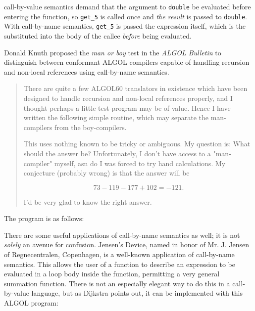 

\Gls{call-by-value} semantics demand that the argument to \texttt{double} be evaluated
before entering the function, so \texttt{get\_5} is called once and
\textit{the result} is passed to \texttt{double}.
With call-by-name semantics, \texttt{get\_5} is passed the expression itself,
which is the substituted into the body of the callee \textit{before}
being evaluated.

Donald Knuth proposed the \textit{man or boy} test in the \textit{ALGOL Bulletin}
to distinguish between
conformant ALGOL compilers capable of handling recursion and non-local references
using call-by-name semantics\cite{Knuth1964ManOrBoy}.

\begin{quotation}
	There are quite a few ALGOL60 translators in existence which have been designed
	to handle recursion and non-local references properly, and I thought perhaps a
	little test-program may be of value. Hence I have written the following simple
	routine, which may separate the man-compilers from the boy-compilers.

	This uses nothing known to be tricky or ambiguous. My question is: What should
	the answer be? Unfortunately, I don't have access to a "man-compiler" myself,
	asn do I was forced to try hand calculations. My conjecture (probably wrong) is
	that the answer will be

	\[
		73 - 119 - 177 + 102 = -121 .
	\]

	I'd be very glad to know the right answer.
\end{quotation}

The program is as follows:



There are some useful applications of call-by-name semantics as well;
it is not \textit{solely} an avenue for confusion.
Jensen's Device, named in honor of Mr. J. Jensen of Regnecentralen, Copenhagen,
is a well-known application of call-by-name semantics.
This allows the user of a function to describe an expression to be evaluated
in a loop body inside the function, permitting a very general summation function.
There is not an especially elegant way to do this in a call-by-value language,
but as Dijkstra points out\cite{dijkstra_defense_of_algol_60_1961},
it can be implemented with this ALGOL program:



